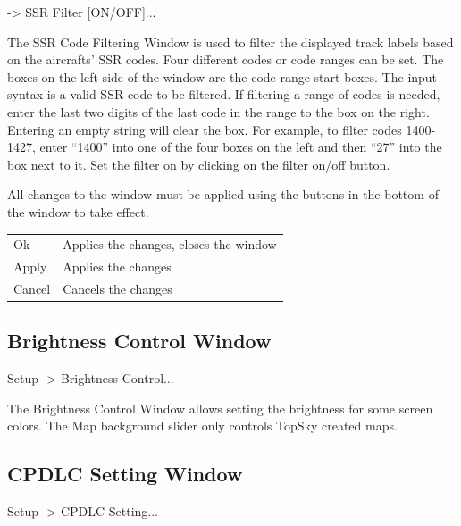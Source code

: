 \documentclass[a4paper,oneside,11pt]{memoir}
\begin{document}
 -> SSR Filter [ON/OFF]...

\bigskip


The SSR Code Filtering Window is used to filter the displayed track labels based on the aircrafts’ SSR codes. Four different codes or code ranges can be set. The boxes on the left side of the window are the code range start boxes. The input syntax is a valid SSR code to be filtered. If filtering a range of codes is needed, enter the last two digits of the last code in the range to the box on the right. Entering an empty string will clear the box. For example, to filter codes 1400-1427, enter “1400” into one of the four boxes on the left and then “27” into the box next to it. Set the filter on by clicking on the filter on/off button.

\bigskip

All changes to the window must be applied using the buttons in the bottom of the window to take effect.

\bigskip

\begin{longtable}{p{2.5cm} p{10cm}}
    Ok      & Applies the changes, closes the window\\
    Apply   & Applies the changes\\
    Cancel  & Cancels the changes\\
\end{longtable}

\subsection{Brightness Control Window}
\label{win:bcw}

 Setup -> Brightness Control...

\bigskip


The Brightness Control Window allows setting the brightness for some screen colors. The Map background slider only controls TopSky created maps.

\subsection{CPDLC Setting Window}
\label{win:dls}

 Setup -> CPDLC Setting...

\bigskip
\end{document}
